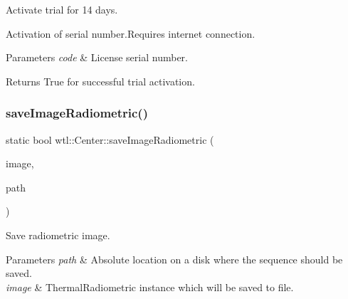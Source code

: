 Activate trial for 14 days. 

Activation of serial number.\+Requires internet connection. 
\begin{DoxyParams}{Parameters}
{\em code} & License serial number. \\
\hline
\end{DoxyParams}
\begin{DoxyReturn}{Returns}
True for successful trial activation. 
\end{DoxyReturn}
\mbox{\label{classwtl_1_1_center_aad7de1457ee843a617a566fe98b2e936}} 
\subsubsection{\texorpdfstring{save\+Image\+Radiometric()}{saveImageRadiometric()}}
{\footnotesize\ttfamily static bool wtl\+::\+Center\+::save\+Image\+Radiometric (\begin{DoxyParamCaption}\item[{const std\+::shared\+\_\+ptr$<$ \hyperlink{classwtl_1_1_image_radiometric}{Image\+Radiometric} $>$}]{image,  }\item[{const std\+::string \&}]{path }\end{DoxyParamCaption})\hspace{0.3cm}{\ttfamily [static]}}



Save radiometric image. 


\begin{DoxyParams}{Parameters}
{\em path} & Absolute location on a disk where the sequence should be saved. \\
\hline
{\em image} & Thermal\+Radiometric instance which will be saved to file. \\
\hline
\end{DoxyParams}
\mbox{\label{classwtl_1_1_center_a118cac736e89810ff0b62e46d0445caf}} 
